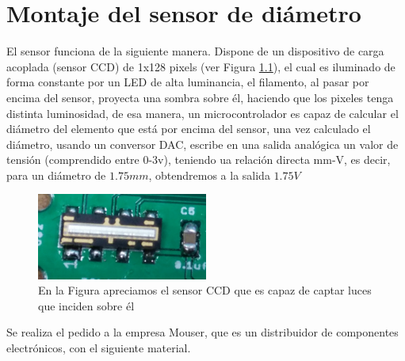 \chapter{Montaje del sensor de diámetro}
\label{ane:sensor}

El sensor funciona de la siguiente manera. Dispone de un dispositivo de carga acoplada (sensor CCD) de 1x128 pixels (ver Figura \ref{fig:sens_CCD}), el cual es iluminado de forma constante por un LED de alta luminancia, el filamento, al pasar por encima del sensor, proyecta una sombra sobre él, haciendo que los pixeles tenga distinta luminosidad, de esa manera, un microcontrolador es capaz de calcular el diámetro del elemento que está por encima del sensor, una vez calculado el diámetro, usando un conversor DAC, escribe en una salida analógica un valor de tensión  (comprendido entre 0-3v), teniendo ua relación directa mm-V, es decir, para un diámetro de $1.75 mm$, obtendremos a la salida $1.75 V$\\
\begin{figure}[H]
    \centering
    \includegraphics[width=0.5\textwidth]{images/sensor/IMG_20150414_135533_.jpg}
    \caption[Sensor CCD lineal.]{En la Figura apreciamos el sensor CCD que es capaz de captar luces que inciden sobre él}
    \label{fig:sens_CCD}
\end{figure}

Se realiza el pedido a la empresa Mouser, que es un distribuidor de componentes electrónicos, con el siguiente material.

